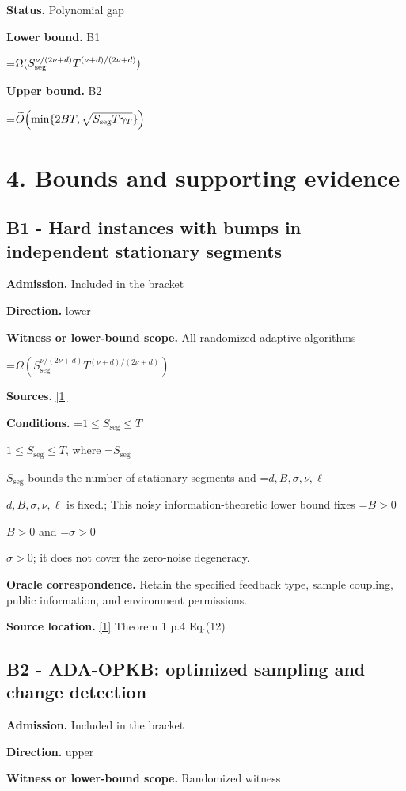 \documentclass[10pt,a4paper]{article}
\newcommand{\AtlasMath}[1]{\par\begingroup\centering\setbox0=\hbox{$\displaystyle #1$}\ifdim\wd0>1.4\linewidth\typeout{ATLAS WIDE FORMULA: \the\wd0}\fi\ifdim\wd0>\linewidth\resizebox{\linewidth}{!}{\box0}\else\box0\fi\par\endgroup}
\newcommand{\AtlasInlineMath}[1]{\begingroup\setbox0=\hbox{$#1$}\ifdim\wd0>.4\linewidth\endgroup\AtlasMath{#1}\else\endgroup$#1$\fi}
\begin{document}
\textbf{Status.} Polynomial gap

\textbf{Lower bound.} B1

\AtlasMath{\Omega(S_{\rm seg}^{\nu/(2\nu+d)}T^{(\nu+d)/(2\nu+d)})}
\textbf{Upper bound.} B2

\AtlasMath{\widetilde{O}\!\left(\min\{2BT,\sqrt{S_{\rm seg}T\gamma_T}\}\right)}
\section{4. Bounds and supporting evidence}
\subsection{B1 - Hard instances with bumps in independent stationary segments}
\textbf{Admission.} Included in the bracket

\textbf{Direction.} lower

\textbf{Witness or lower-bound scope.} All randomized adaptive algorithms

\AtlasMath{\Omega\!\left(S_{\mathrm{seg}}^{\nu/(2\nu+d)}T^{(\nu+d)/(2\nu+d)}\right)}
\textbf{Sources.} \href{https://raw.githubusercontent.com/mlresearch/v258/main/assets/cai25a/cai25a.pdf}{[1]}

\textbf{Conditions.} \AtlasInlineMath{1\le S_{\mathrm{seg}}\le T}, where \AtlasInlineMath{S_{\mathrm{seg}}} bounds the number of stationary segments and \AtlasInlineMath{d,B,\sigma,\nu,\ell} is fixed.; This noisy information-theoretic lower bound fixes \AtlasInlineMath{B>0} and \AtlasInlineMath{\sigma>0}; it does not cover the zero-noise degeneracy.

\textbf{Oracle correspondence.} Retain the specified feedback type, sample coupling, public information, and environment permissions.

\textbf{Source location.} \href{https://raw.githubusercontent.com/mlresearch/v258/main/assets/cai25a/cai25a.pdf}{[1]} Theorem 1 p.4 Eq.(12)

\subsection{B2 - ADA-OPKB: optimized sampling and change detection}
\textbf{Admission.} Included in the bracket

\textbf{Direction.} upper

\textbf{Witness or lower-bound scope.} Randomized witness
\end{document}
